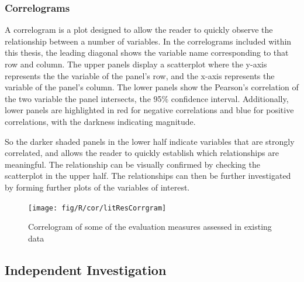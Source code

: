 \begin{minipage}[t]{1\columnwidth}%
\begin{shaded}%

\subsubsection*{Correlograms}

A correlogram is a plot designed to allow the reader to quickly observe
the relationship between a number of variables. In the correlograms
included within this thesis, the leading diagonal shows the variable
name corresponding to that row and column. The upper panels display
a scatterplot where the y-axis represents the the variable of the
panel's row, and the x-axis represents the variable of the panel's
column. The lower panels show the Pearson's correlation of the two
variable the panel intersects, the 95\% confidence interval. Additionally,
lower panels are highlighted in red for negative correlations and
blue for positive correlations, with the darkness indicating magnitude.

So the darker shaded panels in the lower half indicate variables that
are strongly correlated, and allows the reader to quickly establish
which relationships are meaningful. The relationship can be visually
confirmed by checking the scatterplot in the upper half. The relationships
can then be further investigated by forming further plots of the variables
of interest.\end{shaded}%
\end{minipage}

\begin{figure}[h]
\noindent \begin{centering}
\texttt{[image: fig/R/cor/litResCorrgram]}
\par\end{centering}

\protect\caption{\label{fig:litResCorr}Correlogram of some of the evaluation measures
assessed in existing data}
\end{figure}


\clearpage{}


\subsection{Independent Investigation\label{sub:Independent-Investigation-Res}}

